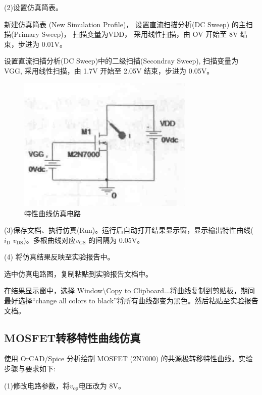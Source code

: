 \documentclass[a4paper,11pt,UTF8]{article}
\numberwithin{equation}{subsection}
\begin{document}
\begin{minipage}[t]{0.6\textwidth}
	(2)设置仿真简表。
	
	 新建仿真简表 (New Simulation Profile)， 设置直流扫描分析(DC Sweep) 的主扫描(Primary Sweep)， 扫描变量为VDD， 采用线性扫描，由 OV 开始至 8V 结束，步进为  0.01V。
	
	 设置直流扫描分析(DC Sweep)中的二级扫描(Secondray Sweep), 扫描变量为 VGG, 采用线性扫描，由 1.7V 开始至 2.05V 结束，步进为 0.05V。
\end{minipage}
\begin{minipage}[t]{0.4\textwidth}
	\begin{figure}[H]
		\centering
		\includegraphics[width=0.75\textwidth]{2.1}
		\caption{特性曲线仿真电路}
	\end{figure}
\end{minipage}


(3)保存文档、执行仿真(Run)。运行后自动打开结果显示窗，显示输出特性曲线($i_\mathrm{D}$ $v_\mathrm{DS}$)。多根曲线对应$v_\mathrm{GS}$ 的间隔为 0.05V。

(4) 将仿真结果反映至实验报告中。

 选中仿真电路图，复制粘贴到实验报告文档中。

 在结果显示窗中，选择 Window\textbackslash Copy to Clipboard...将曲线复制到剪贴板，期间最好选择“change all colors to black”将所有曲线都变为黑色。然后粘贴至实验报告文档。
\subsection{MOSFET转移特性曲线仿真}
使用 OrCAD/Spice 分析绘制 MOSFET (2N7000) 的共源极转移特性曲线。实验步骤与要求如下:

(1)修改电路参数，将$v_\mathrm{op}$电压改为 8V。
\end{document}
